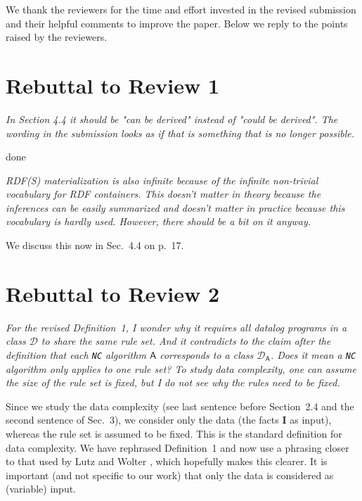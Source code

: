 \documentclass{article}
\let\quoteOld\quote
\let\endquoteOld\endquote
\renewenvironment{quote}{\quoteOld\itshape}{\endquoteOld}
\begin{document}
We thank the reviewers for the time and effort invested in the revised
submission and their helpful comments to improve the paper. Below we
reply to the points raised by the reviewers.


\section{Rebuttal to Review 1}

\begin{quote}
In Section 4.4 it should be "can be derived" instead of "could be derived".
The wording in the submission looks as if that is something that is no
longer possible.
\end{quote}

done

\begin{quote}
RDF(S) materialization is also infinite because of the infinite non-trivial
vocabulary for RDF containers.  This doesn't matter in theory because the
inferences can be easily summarized and doesn't matter in practice because
this vocabulary is hardly used.  However, there should be a bit on it
anyway.
\end{quote}

We discuss this now in Sec.~4.4 on p.~17.


\section{Rebuttal to Review 2}

\begin{quote}
  For the revised Definition~1, I wonder why it requires all datalog
  programs in a class $\mathcal{D}$ to share the same rule set. And it
  contradicts to the claim after the definition that each \texttt{NC}
  algorithm $\mathsf{A}$ corresponds to a class
  $\mathcal{D}_\mathsf{A}$. Does it mean a \texttt{NC} algorithm only
  applies to one rule set? To study data complexity, one can assume
  the size of the rule set is fixed, but I do not see why the rules
  need to be fixed.
\end{quote}

Since we study the data complexity (see last sentence before
Section~2.4 and the second sentence of Sec.~3), we consider only the
data (the facts $\textbf{I}$ as input), whereas the rule set is
assumed to be fixed. This is the standard definition for data
complexity. We have rephrased Definition~1 and now use a phrasing
closer to that used by Lutz and Wolter \cite{LuWo17a}, which hopefully
makes this clearer. It is important (and not specific to our work)
that only the data is considered as (variable) input.
\end{document}
